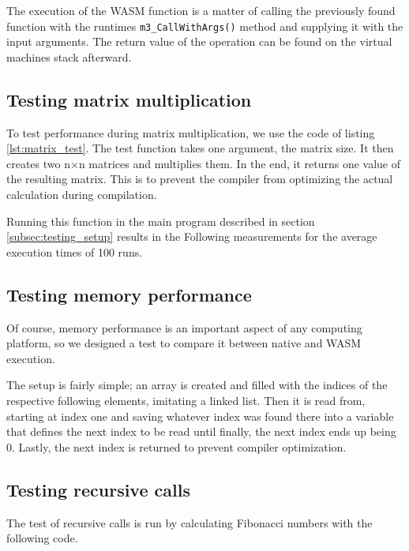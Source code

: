 

The execution of the WASM function is a matter of calling the previously found function with the runtimes \lstinline{m3_CallWithArgs()} method and supplying it with the input arguments. The return value of the operation can be found on the virtual machines stack afterward.

\subsection{Testing matrix multiplication}
To test performance during matrix multiplication, we use the code of listing \ref{lst:matrix_test}. The test function takes one argument, the matrix size. It then creates two n$\times$n matrices and multiplies them. In the end, it returns one value of the resulting matrix. This is to prevent the compiler from optimizing the actual calculation during compilation.



Running this function in the main program described in section \ref{subsec:testing_setup} results in the Following measurements for the average execution times of 100 runs.

\subsection{Testing memory performance}
Of course, memory performance is an important aspect of any computing platform, so we designed a test to compare it between native and WASM execution.

The setup is fairly simple; an array is created and filled with the indices of the respective following elements, imitating a linked list. Then it is read from, starting at index one and saving whatever index was found there into a variable that defines the next index to be read until finally, the next index ends up being 0. Lastly, the next index is returned to prevent compiler optimization.

\subsection{Testing recursive calls}\label{subsec:m_test_recursive}

The test of recursive calls is run by calculating Fibonacci numbers with the following code.

